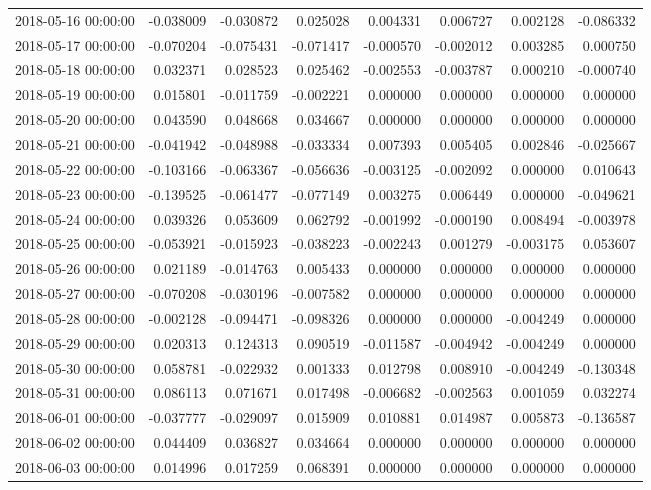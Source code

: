 \begin{tabular}{lrrrrrrr}
2018-05-16 00:00:00 & -0.038009 & -0.030872 & 0.025028 & 0.004331 & 0.006727 & 0.002128 & -0.086332 \\
2018-05-17 00:00:00 & -0.070204 & -0.075431 & -0.071417 & -0.000570 & -0.002012 & 0.003285 & 0.000750 \\
2018-05-18 00:00:00 & 0.032371 & 0.028523 & 0.025462 & -0.002553 & -0.003787 & 0.000210 & -0.000740 \\
2018-05-19 00:00:00 & 0.015801 & -0.011759 & -0.002221 & 0.000000 & 0.000000 & 0.000000 & 0.000000 \\
2018-05-20 00:00:00 & 0.043590 & 0.048668 & 0.034667 & 0.000000 & 0.000000 & 0.000000 & 0.000000 \\
2018-05-21 00:00:00 & -0.041942 & -0.048988 & -0.033334 & 0.007393 & 0.005405 & 0.002846 & -0.025667 \\
2018-05-22 00:00:00 & -0.103166 & -0.063367 & -0.056636 & -0.003125 & -0.002092 & 0.000000 & 0.010643 \\
2018-05-23 00:00:00 & -0.139525 & -0.061477 & -0.077149 & 0.003275 & 0.006449 & 0.000000 & -0.049621 \\
2018-05-24 00:00:00 & 0.039326 & 0.053609 & 0.062792 & -0.001992 & -0.000190 & 0.008494 & -0.003978 \\
2018-05-25 00:00:00 & -0.053921 & -0.015923 & -0.038223 & -0.002243 & 0.001279 & -0.003175 & 0.053607 \\
2018-05-26 00:00:00 & 0.021189 & -0.014763 & 0.005433 & 0.000000 & 0.000000 & 0.000000 & 0.000000 \\
2018-05-27 00:00:00 & -0.070208 & -0.030196 & -0.007582 & 0.000000 & 0.000000 & 0.000000 & 0.000000 \\
2018-05-28 00:00:00 & -0.002128 & -0.094471 & -0.098326 & 0.000000 & 0.000000 & -0.004249 & 0.000000 \\
2018-05-29 00:00:00 & 0.020313 & 0.124313 & 0.090519 & -0.011587 & -0.004942 & -0.004249 & 0.000000 \\
2018-05-30 00:00:00 & 0.058781 & -0.022932 & 0.001333 & 0.012798 & 0.008910 & -0.004249 & -0.130348 \\
2018-05-31 00:00:00 & 0.086113 & 0.071671 & 0.017498 & -0.006682 & -0.002563 & 0.001059 & 0.032274 \\
2018-06-01 00:00:00 & -0.037777 & -0.029097 & 0.015909 & 0.010881 & 0.014987 & 0.005873 & -0.136587 \\
2018-06-02 00:00:00 & 0.044409 & 0.036827 & 0.034664 & 0.000000 & 0.000000 & 0.000000 & 0.000000 \\
2018-06-03 00:00:00 & 0.014996 & 0.017259 & 0.068391 & 0.000000 & 0.000000 & 0.000000 & 0.000000 \\

\end{tabular}

